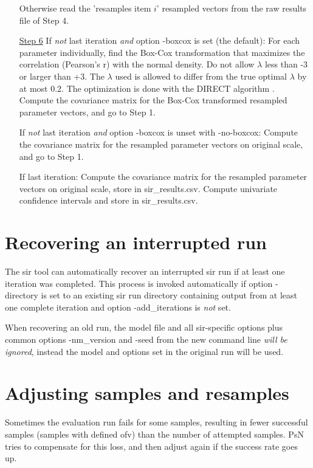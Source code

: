 \begin{itemize}
\noindent Otherwise read the 'resamples item $i$' resampled vectors from the raw results file of Step 4.
\item[\underline{Step 6}]
If \emph{not} last iteration \emph{and} option -boxcox is set (the default): For each parameter individually, find the Box-Cox transformation that maximizes the correlation (Pearson's r) with the normal density. Do not allow $\lambda$ less than -3 or larger than +3. The  $\lambda$ used is allowed to differ from the true optimal  $\lambda$ by at most $0.2$. The optimization is done with the DIRECT algorithm \cite{direct}. Compute the covariance matrix for the Box-Cox transformed resampled parameter vectors, and go to Step 1.

\noindent If \emph{not} last iteration \emph{and} option -boxcox is unset with -no-boxcox: Compute the covariance matrix for the resampled parameter vectors on original scale, and go to Step 1.

\noindent If last iteration:
Compute the covariance matrix for the resampled parameter vectors on original scale, store in sir\_results.csv. Compute univariate confidence intervals and store in sir\_results.csv.
\end{itemize}

\section{Recovering an interrupted run}
The sir tool can automatically recover an interrupted sir run if at least one iteration was completed. This process is invoked automatically if option -directory is set to an existing sir run directory containing output from at least one complete iteration and option -add\_iterations is \emph{not} set.

When recovering an old run, the model file and all sir-specific options plus common options -nm\_version and -seed from
the new command line \emph{will be ignored}, instead the model and options set in the original run will be used.

\section{Adjusting samples and resamples}
Sometimes the evaluation run fails for some samples, resulting in fewer successful samples (samples with defined ofv)
than the number of attempted samples. PsN tries to compensate for this loss, and then adjust again if the success rate goes up. 

